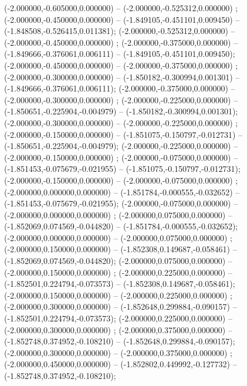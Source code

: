  (-2.000000,-0.605000,0.000000) -- (-2.000000,-0.525312,0.000000) ;
 (-2.000000,-0.450000,0.000000) -- (-1.849105,-0.451101,0.009450) -- (-1.848508,-0.526415,0.011381);
 (-2.000000,-0.525312,0.000000) -- (-2.000000,-0.450000,0.000000) ;
 (-2.000000,-0.375000,0.000000) -- (-1.849666,-0.376061,0.006111) -- (-1.849105,-0.451101,0.009450);
 (-2.000000,-0.450000,0.000000) -- (-2.000000,-0.375000,0.000000) ;
 (-2.000000,-0.300000,0.000000) -- (-1.850182,-0.300994,0.001301) -- (-1.849666,-0.376061,0.006111);
 (-2.000000,-0.375000,0.000000) -- (-2.000000,-0.300000,0.000000) ;
 (-2.000000,-0.225000,0.000000) -- (-1.850651,-0.225904,-0.004979) -- (-1.850182,-0.300994,0.001301);
 (-2.000000,-0.300000,0.000000) -- (-2.000000,-0.225000,0.000000) ;
 (-2.000000,-0.150000,0.000000) -- (-1.851075,-0.150797,-0.012731) -- (-1.850651,-0.225904,-0.004979);
 (-2.000000,-0.225000,0.000000) -- (-2.000000,-0.150000,0.000000) ;
 (-2.000000,-0.075000,0.000000) -- (-1.851453,-0.075679,-0.021955) -- (-1.851075,-0.150797,-0.012731);
 (-2.000000,-0.150000,0.000000) -- (-2.000000,-0.075000,0.000000) ;
 (-2.000000,0.000000,0.000000) -- (-1.851784,-0.000555,-0.032652) -- (-1.851453,-0.075679,-0.021955);
 (-2.000000,-0.075000,0.000000) -- (-2.000000,0.000000,0.000000) ;
 (-2.000000,0.075000,0.000000) -- (-1.852069,0.074569,-0.044820) -- (-1.851784,-0.000555,-0.032652);
 (-2.000000,0.000000,0.000000) -- (-2.000000,0.075000,0.000000) ;
 (-2.000000,0.150000,0.000000) -- (-1.852308,0.149687,-0.058461) -- (-1.852069,0.074569,-0.044820);
 (-2.000000,0.075000,0.000000) -- (-2.000000,0.150000,0.000000) ;
 (-2.000000,0.225000,0.000000) -- (-1.852501,0.224794,-0.073573) -- (-1.852308,0.149687,-0.058461);
 (-2.000000,0.150000,0.000000) -- (-2.000000,0.225000,0.000000) ;
 (-2.000000,0.300000,0.000000) -- (-1.852648,0.299884,-0.090157) -- (-1.852501,0.224794,-0.073573);
 (-2.000000,0.225000,0.000000) -- (-2.000000,0.300000,0.000000) ;
 (-2.000000,0.375000,0.000000) -- (-1.852748,0.374952,-0.108210) -- (-1.852648,0.299884,-0.090157);
 (-2.000000,0.300000,0.000000) -- (-2.000000,0.375000,0.000000) ;
 (-2.000000,0.450000,0.000000) -- (-1.852802,0.449992,-0.127732) -- (-1.852748,0.374952,-0.108210);
